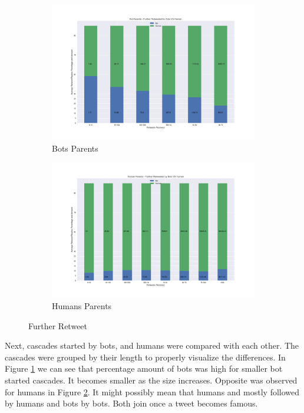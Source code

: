 \documentclass[letterpaper]{article}
\begin{document}
\begin{figure}[H]
    \centering
    \begin{subfigure}[b]{1\linewidth}
      \includegraphics[width=\linewidth]{images/bots_furtherretweeted.png}
      \caption{Bots Parents}
      \label{fig:further_retweet_bots}
    \end{subfigure}
    \begin{subfigure}[b]{1\linewidth}
      \includegraphics[width=\linewidth]{images/humans_furtherretweeted.png}
      \caption{Humans Parents}
      \label{fig:further_retweet_humans}
    \end{subfigure}
    \caption{Further Retweet}
    \label{fig:further_retweet}
  \end{figure}

  Next, cascades started by bots, and humans were compared with each other. The cascades were grouped by their length to properly visualize the differences. 
  In Figure \ref{fig:further_retweet_bots} we can see that percentage amount of bots was high for smaller bot started cascades. It becomes smaller as the size increases. 
  Opposite was observed for humans in Figure \ref{fig:further_retweet_humans}. It might possibly mean that humans and mostly followed by humans and bots by bots. Both join once a tweet becomes famous.
\end{document}
